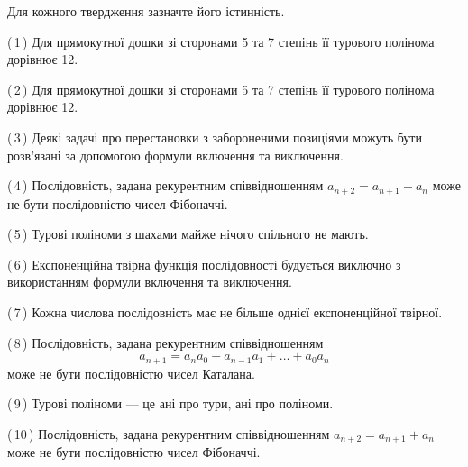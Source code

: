 \documentclass[12pt, ukrainian]{article}
\begin{document}
\begin {large}
\begin {large}
\begin {large}
\begin {large}
\begin {large}
\begin {large}
\begin {large}
\begin {large}
\begin {large}
\begin {large}
\begin {large}
\begin {large}
\begin {large}
\begin {large}
\begin {large}
\begin {large}
\begin {large}
\begin {large}
\begin {large}
\begin {large}
\begin {large}
\begin {large}
\begin {large}
\begin {large}
\begin {large}
\begin {large}
\begin {large}
\begin {large}
\begin {large}
\begin {large}
\begin {large}
\begin {large}
\begin {large}
\begin {large}
\begin {large}
\begin {large}
\begin {large}
\begin {large}
\begin {large}
\begin {large}
\begin {large}
\begin {large}
{
Для кожного твердження зазначте його істинність.\par

\vspace{2mm}

(\,1\,) Для прямокутної дошки зі сторонами 5 та 7 степінь її турового полінома дорівнює 12.%



(\,2\,) Для прямокутної дошки зі сторонами 5 та 7 степінь її турового полінома дорівнює 12.%



(\,3\,) Деякі задачі про перестановки з забороненими позиціями можуть бути розв’я\-за\-ні за допомогою формули включення та виключення.%



(\,4\,) Послідовність, задана рекурентним співвідношенням $a_{n+2}=a_{n+1}+a_{n}$ може не бути послідовністю чисел Фібоначчі.%



(\,5\,) Турові поліноми з шахами майже нічого спільного не мають.%



(\,6\,) Експоненційна твірна функція послідовності будується виключно з використанням формули включення та виключення.%



(\,7\,) Кожна числова послідовність має не більше однієї  експоненційної твірної.%



(\,8\,) Послідовність, задана рекурентним співвідношенням $$a_{n+1}=a_{n}a_{0}+a_{n-1}a_{1}+\ldots+a_0a_{n}$$ може не бути послідовністю чисел Каталана.%



(\,9\,) Турові поліноми --- це ані про тури, ані про поліноми.%



(\,10\,) Послідовність, задана рекурентним співвідношенням $a_{n+2}=a_{n+1}+a_{n}$ може не бути послідовністю чисел Фібоначчі.%




}
\end{large}
\end{large}
\end{large}
\end{large}
\end{large}
\end{large}
\end{large}
\end{large}
\end{large}
\end{large}
\end{large}
\end{large}
\end{large}
\end{large}
\end{large}
\end{large}
\end{large}
\end{large}
\end{large}
\end{large}
\end{large}
\end{large}
\end{large}
\end{large}
\end{large}
\end{large}
\end{large}
\end{large}
\end{large}
\end{large}
\end{large}
\end{large}
\end{large}
\end{large}
\end{large}
\end{large}
\end{large}
\end{large}
\end{large}
\end{large}
\end{large}
\end{large}
\end{document}
